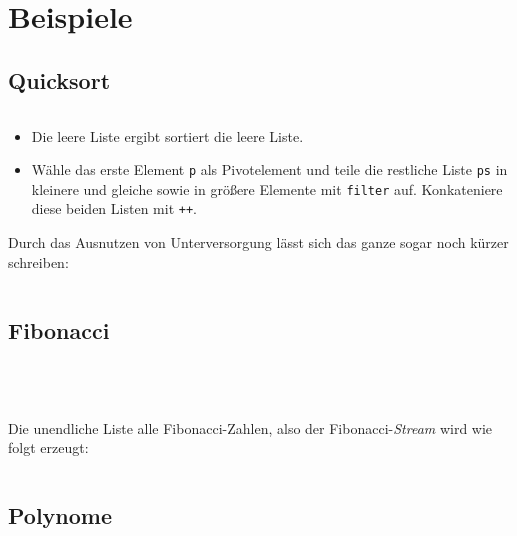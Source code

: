 \section{Beispiele}
\subsection{Quicksort}
\inputminted[linenos, numbersep=5pt, tabsize=4, frame=lines, label=qsort.hs]{haskell}{scripts/haskell/qsort.hs}

\begin{itemize}
    \item Die leere Liste ergibt sortiert die leere Liste.
    \item Wähle das erste Element \texttt{p} als Pivotelement und
          teile die restliche Liste \texttt{ps} in kleinere und 
          gleiche sowie in größere Elemente mit \texttt{filter} auf.
          Konkateniere diese beiden Listen mit \texttt{++}.
\end{itemize}

Durch das Ausnutzen von Unterversorgung lässt
sich das ganze sogar noch kürzer schreiben:

\inputminted[linenos, numbersep=5pt, tabsize=4, frame=lines, label=qsort.hs]{haskell}{scripts/haskell/qsort-unterversorg.hs}

\subsection{Fibonacci}
\inputminted[linenos, numbersep=5pt, tabsize=4, frame=lines, label=fibonacci.hs]{haskell}{scripts/haskell/fibonacci.hs}
\inputminted[linenos, numbersep=5pt, tabsize=4, frame=lines, label=fibonacci-akk.hs]{haskell}{scripts/haskell/fibonacci-akk.hs}
\inputminted[linenos, numbersep=5pt, tabsize=4, frame=lines, label=fibonacci-zip.hs]{haskell}{scripts/haskell/fibonacci-zip.hs}
\inputminted[linenos, numbersep=5pt, tabsize=4, frame=lines, label=fibonacci-pattern-matching.hs]{haskell}{scripts/haskell/fibonacci-pattern-matching.hs}

Die unendliche Liste alle Fibonacci-Zahlen, also der Fibonacci-\textit{Stream}
wird wie folgt erzeugt:

\inputminted[linenos, numbersep=5pt, tabsize=4, frame=lines, label=fibonacci-stream.hs]{haskell}{scripts/haskell/fibonacci-stream.hs}

\subsection{Polynome}%
\inputminted[linenos, numbersep=5pt, tabsize=4, frame=lines, label=polynome.hs]{haskell}{scripts/haskell/polynome.hs}

